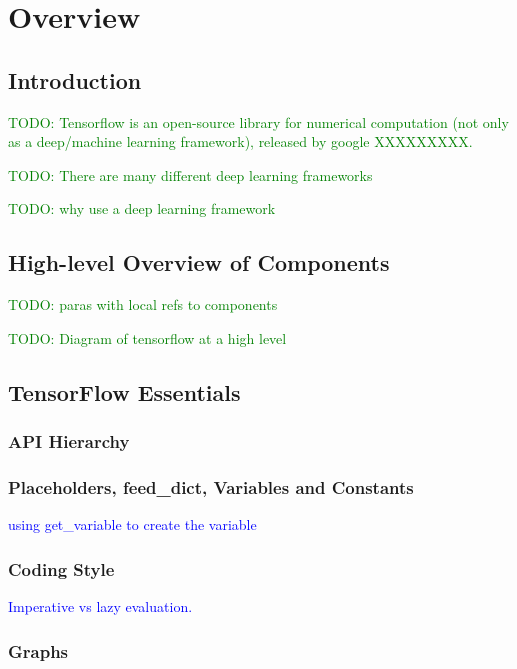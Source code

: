 \chapter{Overview}


\section{Introduction}

\textcolor{green}{TODO: Tensorflow is an open-source library for numerical computation (not only as a deep/machine learning framework), released by google XXXXXXXXX.}

\textcolor{green}{TODO: There are many different deep learning frameworks}

\textcolor{green}{TODO: why use a deep learning framework}

\section{High-level Overview of Components}

\textcolor{green}{TODO: paras with local refs to components}

\textcolor{green}{TODO: Diagram of tensorflow at a high level}


\section{TensorFlow Essentials}

\subsection{API Hierarchy}

\subsection{Placeholders, feed\_dict, Variables and Constants}

\textcolor{blue}{using get\_variable to create the variable}

\subsection{Coding Style}

\textcolor{blue}{Imperative vs lazy evaluation.}

\subsection{Graphs}

